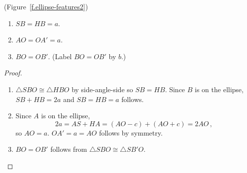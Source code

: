 
\begin{theorem}(Figure~\ref{f.ellipse-features2})\label{thm.ellipses-features}
\begin{enumerate}
\item $SB=HB=a$.
\item $AO=OA'=a$.
\item $BO=OB'$. (Label $BO=OB'$ by $b$.)
\end{enumerate}
\end{theorem}

\begin{proof}
\begin{enumerate}
\item $\triangle SBO\cong\triangle HBO$ by side-angle-side  so $SB=HB$. Since $B$ is on the ellipse, $SB+HB=2a$ and $SB=HB=a$ follows. 
\item Since $A$ is on the ellipse,
\[
2a = AS+HA = (AO-c)+(AO+c)=2AO\,,
\]
so $AO=a$. $OA'=a=AO$ follows by symmetry.
\item $BO=OB'$ follows from $\triangle SBO\cong\triangle SB'O$.\hqed
\end{enumerate}
\end{proof}

%
%
%
%
%

